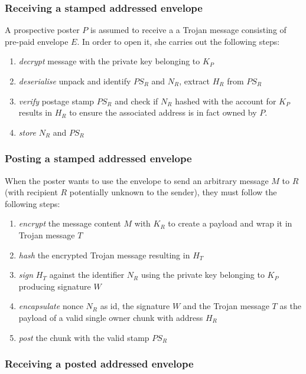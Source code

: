 \subsubsection{Receiving a stamped addressed envelope}

A prospective poster $P$ is assumed to receive a a Trojan message consisting of pre-paid envelope $E$. In order to open it, she carries out the following steps:

\begin{enumerate}[noitemsep]
    \item \emph{decrypt} message with the private key belonging to $K_P$
    \item \emph{deserialise} unpack and identify $PS_R$ and $N_R$, extract $H_R$ from $PS_R$
    \item \emph{verify} postage stamp $PS_R$ and check if $N_R$ hashed with the account for $K_P$ results in $H_R$ to ensure the associated address is in fact owned by $P$.
    \item \emph{store} $N_R$ and $PS_R$ 
\end{enumerate}

\subsubsection{Posting a stamped addressed envelope}

When the poster wants to use the envelope to send an arbitrary message $M$ to $R$ (with recipient $R$ potentially unknown to the sender), they must follow the following steps:

\begin{enumerate}[noitemsep]
\item \emph{encrypt} the message content $M$ with $K_R$ to create a payload and wrap it in Trojan message $T$
\item \emph{hash} the encrypted Trojan message resulting in $H_T$
\item \emph{sign} $H_T$ against the identifier $N_R$ using the private key belonging to $K_P$ producing signature $W$
\item \emph{encapsulate} nonce $N_R$ as id, the signature $W$ and the Trojan message $T$ as the payload of a valid single owner chunk with address $H_R$
\item \emph{post} the chunk with the valid stamp $PS_R$
\end{enumerate}

\subsubsection{Receiving a posted addressed envelope}

